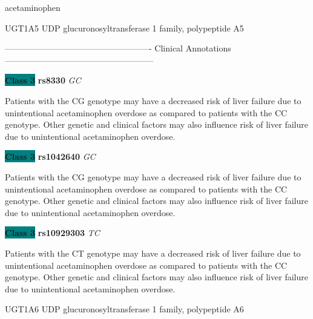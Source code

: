 \documentclass{resume} %
\begin{document}
\begin{rSection}{ acetaminophen }
\begin{rSubsection}{ UGT1A5 }{ UDP glucuronosyltransferase 1 family, polypeptide A5 }{}{}
\item[] ---------------------------------------------------- Clinical Annotations -----------------------------------------------------\newline
\item \textbf{\colorbox{teal} {Class 3}} \textbf{ rs8330 } \textit{ GC }
\item[] Patients with the CG genotype may have a decreased risk of liver failure due to unintentional acetaminophen overdose as compared to patients with the CC genotype. Other genetic and clinical factors may also influence risk of liver failure due to unintentional acetaminophen overdose.\item \textbf{\colorbox{teal} {Class 3}} \textbf{ rs1042640 } \textit{ GC }
\item[] Patients with the CG genotype may have a decreased risk of liver failure due to unintentional acetaminophen overdose as compared to patients with the CC genotype. Other genetic and clinical factors may also influence risk of liver failure due to unintentional acetaminophen overdose.\item \textbf{\colorbox{teal} {Class 3}} \textbf{ rs10929303 } \textit{ TC }
\item[] Patients with the CT genotype may have a decreased risk of liver failure due to unintentional acetaminophen overdose as compared to patients with the CC genotype. Other genetic and clinical factors may also influence risk of liver failure due to unintentional acetaminophen overdose.
\end{rSubsection}\begin{rSubsection}{ UGT1A6 }{ UDP glucuronosyltransferase 1 family, polypeptide A6 }{}{}
\item[]


\end{rSubsection}
\end{rSection}
\end{document}
